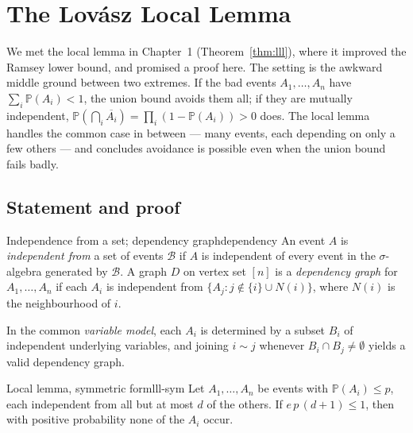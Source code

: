 \providecommand{\E}{\mathbb{E}}
\providecommand{\Prob}{\mathbb{P}}
\providecommand{\whp}{\textit{whp}}

\chapter{The Lov\'asz Local Lemma}
\label{chap:lll}

We met the local lemma in Chapter~1 (Theorem~\ref{thm:lll}), where it improved
the Ramsey lower bound, and promised a proof here. The setting is the awkward
middle ground between two extremes. If the bad events $A_1,\dots,A_n$ have
$\sum_i\Prob(A_i)<1$, the union bound avoids them all; if they are mutually
independent, $\Prob(\bigcap_i\overline{A_i})=\prod_i(1-\Prob(A_i))>0$ does. The
local lemma handles the common case in between --- many events, each depending on
only a few others --- and concludes avoidance is possible even when the union
bound fails badly.

\section{Statement and proof}

\begin{definition}{Independence from a set; dependency graph}{dependency}
An event $A$ is \emph{independent from} a set of events $\mathcal B$ if
$A$ is independent of every event in the $\sigma$-algebra generated by
$\mathcal B$. A graph $D$ on vertex set $[n]$ is a \emph{dependency graph} for
$A_1,\dots,A_n$ if each $A_i$ is independent from
$\{A_j:j\notin\{i\}\cup N(i)\}$, where $N(i)$ is the neighbourhood of $i$.
\end{definition}

In the common \emph{variable model}, each $A_i$ is determined by a subset $B_i$
of independent underlying variables, and joining $i\sim j$ whenever
$B_i\cap B_j\ne\emptyset$ yields a valid dependency graph.

\begin{theorem}{Local lemma, symmetric form}{lll-sym}
Let $A_1,\dots,A_n$ be events with $\Prob(A_i)\le p$, each independent from all
but at most $d$ of the others. If $e\,p\,(d+1)\le1$, then with positive
probability none of the $A_i$ occur.
\end{theorem}

